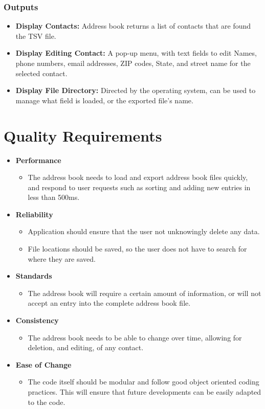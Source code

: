 \documentclass[a4paper, 11pt]{article}
\begin{document}
\subsubsection{Outputs}
\begin{itemize}
	\item \textbf{Display Contacts: } Address book returns a list of contacts that are found the TSV file.
	\item \textbf{Display Editing Contact: } A pop-up menu, with text fields to edit Names, phone numbers, email addresses, ZIP codes, State, and street name for the selected contact.
	\item \textbf{Display File Directory: }Directed by the operating system, can be used to manage what field is loaded, or the exported file's name.
\end{itemize}

\section{Quality Requirements}
\begin{itemize}
	\item \textbf{Performance}
	\begin{itemize}
		\item The address book needs to load and export address book files quickly, and respond to user requests such as sorting and adding new entries in less than 500ms.
	\end{itemize}
	\item \textbf{Reliability}
	\begin{itemize}
		\item Application should ensure that the user not unknowingly delete any data.
		\item File locations should be saved, so the user does not have to search for where they are saved.
	\end{itemize}
	\item \textbf{Standards}
	\begin{itemize}
		\item The address book will require a certain amount of information, or will not accept an entry into the complete address book file.
	\end{itemize}
		\item \textbf{Consistency}
	\begin{itemize}
		\item The address book needs to be able to change over time, allowing for deletion, and editing, of any contact.
	\end{itemize}
	\item \textbf{Ease of Change}
	\begin{itemize}
	\item The code itself should be modular and follow good object oriented coding practices. This will ensure that future developments can be easily adapted to the code.	
	\end{itemize}

\end{itemize}
\end{document}
